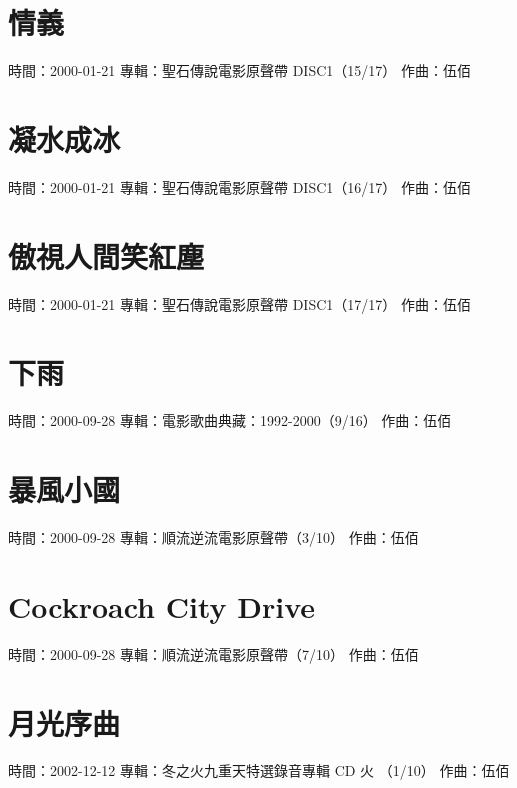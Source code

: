 \documentclass[UTF8,a4paper,oneside,twocolumn,12pt]{ctexbook}
\newcommand{\infopair}[2]{\textbullet #1：#2}
\newcommand{\zq}[1][伍佰]{\infopair{作曲}{#1}}
\newcommand{\zj}[1]{\infopair{專輯}{#1}}
\newcommand{\sj}[1]{\infopair{時間}{#1}}
\newenvironment{info}{\begin{flushleft}\kaishu
	}
	{\end{flushleft}\normalsize\yahei\par}
\begin{document}
\section{情義}
\begin{info}
	\sj{2000-01-21}
	\zj{聖石傳說電影原聲帶 DISC1（15/17）}
	\zq
\end{info}

\section{凝水成冰}
\begin{info}
	\sj{2000-01-21}
	\zj{聖石傳說電影原聲帶 DISC1（16/17）}
	\zq
\end{info}

\section{傲視人間笑紅塵}
\begin{info}
	\sj{2000-01-21}
	\zj{聖石傳說電影原聲帶 DISC1（17/17）}
	\zq
\end{info}

\section{下雨}
\begin{info}
	\sj{2000-09-28}
	\zj{電影歌曲典藏：1992-2000（9/16）}
	\zq
\end{info}

\section{暴風小國}
\begin{info}
	\sj{2000-09-28}
	\zj{順流逆流電影原聲帶（3/10）}
	\zq
\end{info}

\section{Cockroach City Drive}
\begin{info}
	\sj{2000-09-28}
	\zj{順流逆流電影原聲帶（7/10）}
	\zq
\end{info}

\section{月光序曲}
\begin{info}
	\sj{2002-12-12}
	\zj{冬之火九重天特選錄音專輯 CD 火 （1/10）}
	\zq
\end{info}
\end{document}
